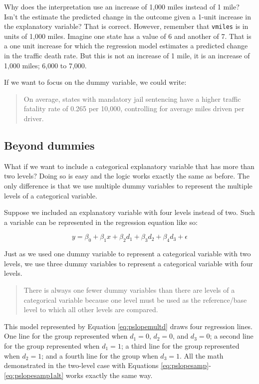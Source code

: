 \documentclass[
]{book}
\begin{document}
Why does the interpretation use an increase of 1,000 miles instead of 1 mile? Isn't the estimate the predicted change in the outcome given a 1-unit increase in the explanatory variable? That is correct. However, remember that \texttt{vmiles} is in units of 1,000 miles. Imagine one state has a value of 6 and another of 7. That is a one unit increase for which the regression model estimates a predicted change in the traffic death rate. But this is not an increase of 1 mile, it is an increase of 1,000 miles; 6,000 to 7,000.

If we want to focus on the dummy variable, we could write:

\begin{quote}
On average, states with mandatory jail sentencing have a higher traffic fatality rate of 0.265 per 10,000, controlling for average miles driven per driver.
\end{quote}

\hypertarget{beyond-dummies}{%
\subsection{Beyond dummies}\label{beyond-dummies}}

What if we want to include a categorical explanatory variable that has more than two levels? Doing so is easy and the logic works exactly the same as before. The only difference is that we use multiple dummy variables to represent the multiple levels of a categorical variable.

Suppose we included an explanatory variable with four levels instead of two. Such a variable can be represented in the regression equation like so:

\begin{equation}
y = \beta_0 + \beta_1x + \beta_2d_1 + \beta_3d_2 + \beta_4d_3 + \epsilon
\label{eq:pslopemultd}
\end{equation}

Just as we used one dummy variable to represent a categorical variable with two levels, we use three dummy variables to represent a categorical variable with four levels.

\begin{quote}
There is always one fewer dummy variables than there are levels of a categorical variable because one level must be used as the reference/base level to which all other levels are compared.
\end{quote}

This model represented by Equation \eqref{eq:pslopemultd} draws four regression lines. One line for the group represented when \(d_1=0\), \(d_2=0\), and \(d_3=0\); a second line for the group represented when \(d_1=1\); a third line for the group represented when \(d_2=1\); and a fourth line for the group when \(d_3=1\). All the math demonstrated in the two-level case with Equations \eqref{eq:pslopesamp}-\eqref{eq:pslopesamp1alt} works exactly the same way.
\end{document}
